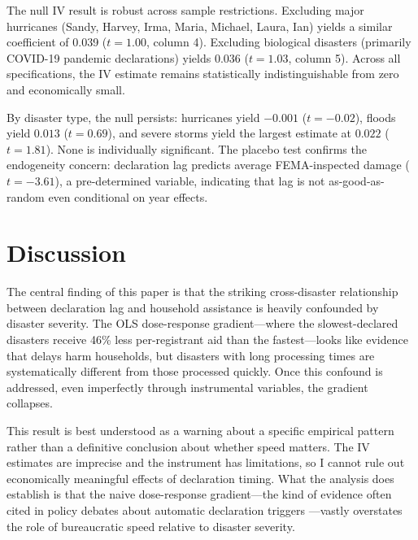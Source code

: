 \documentclass[12pt]{article}
\begin{document}
The null IV result is robust across sample restrictions. Excluding major hurricanes (Sandy, Harvey, Irma, Maria, Michael, Laura, Ian) yields a similar coefficient of 0.039 ($t = 1.00$, column 4). Excluding biological disasters (primarily COVID-19 pandemic declarations) yields 0.036 ($t = 1.03$, column 5). Across all specifications, the IV estimate remains statistically indistinguishable from zero and economically small.

By disaster type, the null persists: hurricanes yield $-0.001$ ($t = -0.02$), floods yield $0.013$ ($t = 0.69$), and severe storms yield the largest estimate at $0.022$ ($t = 1.81$). None is individually significant. The placebo test confirms the endogeneity concern: declaration lag predicts average FEMA-inspected damage ($t = -3.61$), a pre-determined variable, indicating that lag is not as-good-as-random even conditional on year effects.


\section{Discussion}

The central finding of this paper is that the striking cross-disaster relationship between declaration lag and household assistance is heavily confounded by disaster severity. The OLS dose-response gradient---where the slowest-declared disasters receive 46\% less per-registrant aid than the fastest---looks like evidence that delays harm households, but disasters with long processing times are systematically different from those processed quickly. Once this confound is addressed, even imperfectly through instrumental variables, the gradient collapses.

This result is best understood as a warning about a specific empirical pattern rather than a definitive conclusion about whether speed matters. The IV estimates are imprecise and the instrument has limitations, so I cannot rule out economically meaningful effects of declaration timing. What the analysis does establish is that the naive dose-response gradient---the kind of evidence often cited in policy debates about automatic declaration triggers \citep{lindsay2024}---vastly overstates the role of bureaucratic speed relative to disaster severity.
\end{document}
